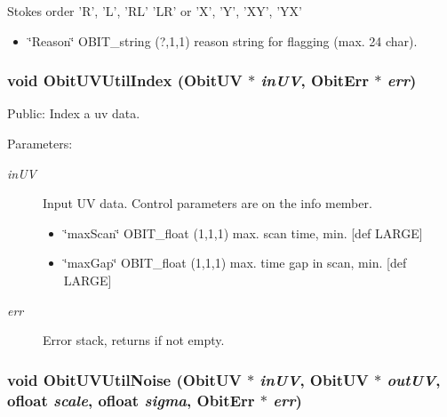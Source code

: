 Stokes order 'R', 'L', 'RL' 'LR' or 'X', 'Y', 'XY', 'YX' \begin{itemize}
\item \char`\"{}Reason\char`\"{} OBIT\_\-string (?,1,1) reason string for flagging (max. 24 char). 
\end{itemize}
\subsubsection{\setlength{\rightskip}{0pt plus 5cm}void Obit\-UVUtil\-Index ({\bf Obit\-UV} $\ast$ {\em in\-UV}, {\bf Obit\-Err} $\ast$ {\em err})}\label{ObitUVUtil_8c_a9}


Public: Index a uv data. 

\begin{Desc}
\item[Parameters:]
\begin{description}
\item[{\em in\-UV}]Input UV data. Control parameters are on the info member. \begin{itemize}
\item \char`\"{}max\-Scan\char`\"{} OBIT\_\-float (1,1,1) max. scan time, min. [def LARGE] \item \char`\"{}max\-Gap\char`\"{} OBIT\_\-float (1,1,1) max. time gap in scan, min. [def LARGE] \end{itemize}
\item[{\em err}]Error stack, returns if not empty. \end{description}
\end{Desc}
\subsubsection{\setlength{\rightskip}{0pt plus 5cm}void Obit\-UVUtil\-Noise ({\bf Obit\-UV} $\ast$ {\em in\-UV}, {\bf Obit\-UV} $\ast$ {\em out\-UV}, {\bf ofloat} {\em scale}, {\bf ofloat} {\em sigma}, {\bf Obit\-Err} $\ast$ {\em err})}\label{ObitUVUtil_8c_a16}


